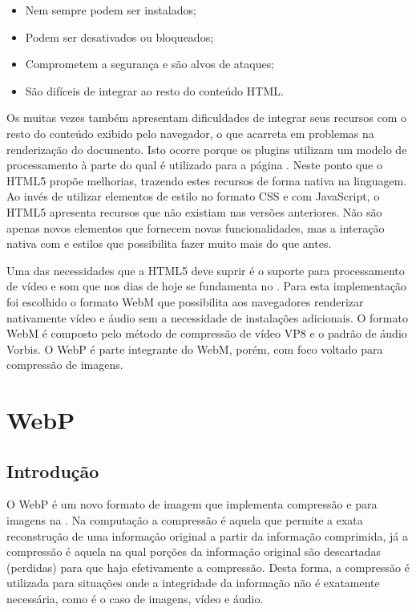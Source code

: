 \documentclass[espaco=simples,appendix=Name]{abnt}
\begin{document}
\begin{itemize}
		\item Nem sempre podem ser instalados;
		\item Podem ser desativados ou bloqueados;
		\item Comprometem a segurança e são alvos de ataques;
		\item São difíceis de integrar ao resto do conteúdo HTML.
\end{itemize}

Os  muitas vezes também apresentam dificuldades de integrar seus recursos com o resto do conteúdo exibido pelo navegador, o que acarreta em problemas na renderização do documento. Isto ocorre porque os plugins utilizam um modelo de processamento à parte do qual é utilizado para a página . Neste ponto que o HTML5 propõe melhorias, trazendo estes recursos de forma nativa na linguagem. Ao invés de utilizar elementos de estilo no formato CSS e  com JavaScript, o HTML5 apresenta recursos que não existiam nas versões anteriores. Não são apenas novos elementos que fornecem novas funcionalidades, mas a interação nativa com  e estilos que possibilita fazer muito mais do que antes\cite{HTML5Intro}.

Uma das necessidades que a HTML5 deve suprir é o suporte para processamento de vídeo e som que nos dias de hoje se fundamenta no . Para esta implementação foi escolhido o formato WebM que possibilita aos navegadores renderizar nativamente vídeo e áudio sem a necessidade de instalações adicionais. O formato WebM é composto pelo método de compressão de vídeo VP8 e o padrão de áudio Vorbis. O WebP é parte integrante do WebM, porém, com foco voltado para compressão de imagens.

\chapter{WebP}

\section{Introdução}

O WebP é um novo formato de imagem que implementa compressão  e  para imagens na . Na computação a compressão  é aquela que permite a exata reconstrução de uma informação original a partir da informação comprimida, já a compressão  é aquela na qual porções da informação original são descartadas (perdidas) para que haja efetivamente a compressão. Desta forma, a compressão  é utilizada para situações onde a integridade da informação não é exatamente necessária, como é o caso de imagens, vídeo e áudio. 
\end{document}

